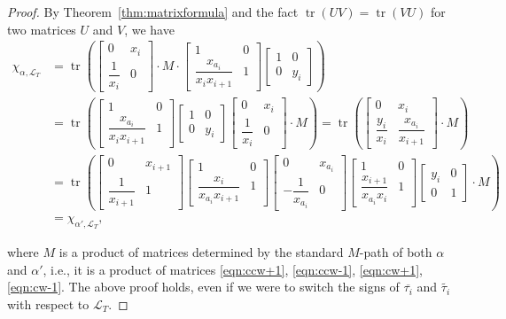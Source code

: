 \documentclass[pdftex]{sigma}
\numberwithin{equation}{section}
\theoremstyle{definition}
\begin{document}
\begin{proof}
 By Theorem~\ref{thm:matrixformula} and the fact $\operatorname{tr}(UV)=\operatorname{tr}(VU)$ for two matrices $U$ and $V$, we have
 \begin{align*}
 \chi_{\alpha, \mathcal{L}_T}&=\operatorname{tr}\left(
 \begin{bmatrix}
 0 & x_i\\
 \dfrac{1}{x_i} & 0
 \end{bmatrix}\cdot M\cdot
 \begin{bmatrix}
 1 & 0\\
 \dfrac{x_{a_i}}{x_i x_{i+1}} & 1
 \end{bmatrix}
 \begin{bmatrix}
 1 & 0\\
 0 & y_i
 \end{bmatrix}\right)\\
 &=\operatorname{tr}\left(
 \begin{bmatrix}
 1 & 0\\
 \dfrac{x_{a_i}}{x_i x_{i+1}} & 1
 \end{bmatrix}
 \begin{bmatrix}
 1 & 0\\
 0 & y_i
 \end{bmatrix}
 \begin{bmatrix}
 0 & x_i\\
 \dfrac{1}{x_i} & 0
 \end{bmatrix}\cdot M
 \right)
 = \operatorname{tr}\left(
 \begin{bmatrix}
 0 & x_i\\
 \dfrac{y_i}{x_i} & \dfrac{x_{a_i}}{x_{i+1}}
 \end{bmatrix}\cdot M
 \right)\\
 &=\operatorname{tr}\left(
 \begin{bmatrix}
 0 & x_{i+1}\\
 \dfrac{1}{x_{i+1}} & 1
 \end{bmatrix}
 \begin{bmatrix}
 1 & 0\\
 \dfrac{x_i}{x_{a_i} x_{i+1}} & 1
 \end{bmatrix}
 \begin{bmatrix}
 0 & x_{a_i}\\
 -\dfrac{1}{x_{a_i}} & 0
 \end{bmatrix}
 \begin{bmatrix}
 1 & 0\\
 \dfrac{x_{i+1}}{x_{a_i}x_{i}} & 1
 \end{bmatrix}
 \begin{bmatrix}
 y_i & 0\\
 0 & 1
 \end{bmatrix}\cdot M
 \right)\\
 & = \chi_{\alpha', \mathcal{L}_T},
\end{align*}

\noindent where $M$ is a product of matrices determined by the standard $M$-path of both $\alpha$ and $\alpha'$, i.e., it is a product of matrices \eqref{eqn:ccw+1}, \eqref{eqn:ccw-1}, \eqref{eqn:cw+1}, \eqref{eqn:cw-1}. The above proof holds, even if we were to switch the signs of $\overline{\tau_i}$ and $\widetilde{\tau_i}$ with respect to $\mathcal{L}_T$.
\end{proof}
\end{document}
